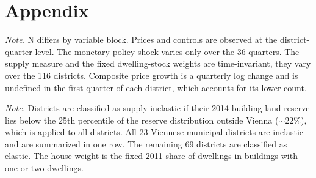 \documentclass[a4paper,12pt, headsepline]{scrartcl}
\newcommand{\figcap}[2]{\caption[#1]{\textbf{#1}\newline #2}}
\numberwithin{equation}{section}
\begin{document}
\newpage
\printbibliography[heading=bibintoc]

\newpage
\appendix
\setcounter{table}{0}
\setcounter{figure}{0}
\section{Appendix}\label{sec:appendix}

\begin{table}[H]
	\centering
	\figcap{Summary statistics of the analysis variables}{}\label{tab:summary-stats}
	

	\vspace{0.2cm}
	\begin{minipage}{0.9\textwidth}
		\footnotesize
		\textit{Note.} N differs by variable block. Prices and controls are observed at the district-quarter level. The monetary policy shock varies only over the 36 quarters. The supply measure and the fixed dwelling-stock weights are time-invariant, they vary over the 116 districts. Composite price growth is a quarterly log change and is undefined in the first quarter of each district, which accounts for its lower count.
	\end{minipage}
\end{table}

\begin{table}[H]
	\centering
	\figcap{Panel construction and integrity diagnostics}{}\label{tab:panel-integrity}
	
\end{table}

\begin{table}[H]
	\centering
	\figcap{Supply-inelastic districts under the baseline classification}{}\label{tab:inelastic-districts}
	

	\vspace{0.2cm}
	\begin{minipage}{0.9\textwidth}
		\footnotesize
		\textit{Note.} Districts are classified as supply-inelastic if their 2014 building land reserve lies below the 25th percentile of the reserve distribution outside Vienna ($\sim$22\%), which is applied to all districts. All 23 Viennese municipal districts are inelastic and are summarized in one row. The remaining 69 districts are classified as elastic. The house weight is the fixed 2011 share of dwellings in buildings with one or two dwellings.
	\end{minipage}
\end{table}
\end{document}
